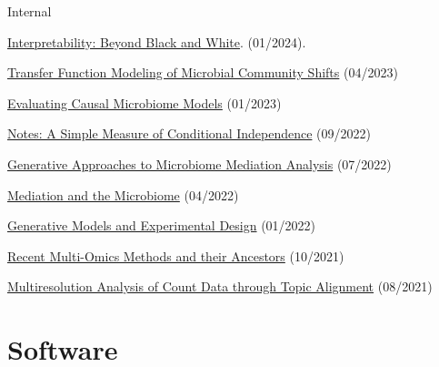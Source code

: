 \documentclass[letterpaper]{article}
\renewenvironment{itemize}{
  \begin{list}{}{
    \setlength{\leftmargin}{1.5em}
  }
}{
  \end{list}
}
\begin{document}
Internal
\begin{itemize}
  \item \href{https://github.com/krisrs1128/talks/blob/master/2024/20240119/20240119.pptx}{Interpretability: Beyond Black and White}. (01/2024).
  \item \href{https://krisrs1128.github.io/talks/2023/20230414/20230414.html}{Transfer Function Modeling of Microbial Community Shifts} (04/2023)
  \item \href{https://krisrs1128.github.io/talks/2023/20230120/20230120.html}{Evaluating Causal Microbiome Models} (01/2023)
  \item \href{https://krisrs1128.github.io/talks/2022/20220930/20220930.html}{Notes: A Simple Measure of Conditional Independence} (09/2022)
  \item \href{https://drive.google.com/file/d/1n6gEubzFuIRRRYxGewY81k1ZdQS24oKg/view}{Generative Approaches to Microbiome Mediation Analysis} (07/2022)
  \item \href{https://drive.google.com/file/d/17xNjMA-pH70wM_gknUnM0A5gr0k87gAo/view}{Mediation and the Microbiome} (04/2022)
  \item \href{https://drive.google.com/file/d/1OMIulBki_0an7Lwd0MKPGH1f0OdK0etH/view}{Generative Models and Experimental Design} (01/2022)
  \item \href{https://drive.google.com/file/d/1L2crRIcdbql__XZdJuiRXkAKsvwrIZLO/view}{Recent Multi-Omics Methods and their Ancestors} (10/2021)
  \item \href{https://drive.google.com/file/d/1VcXF0fAK2IlA3yXeqnJ_1CGC6BP4zPqp/view}{Multiresolution Analysis of Count Data through Topic Alignment} (08/2021)
\end{itemize}

\section*{Software}
\end{document}
